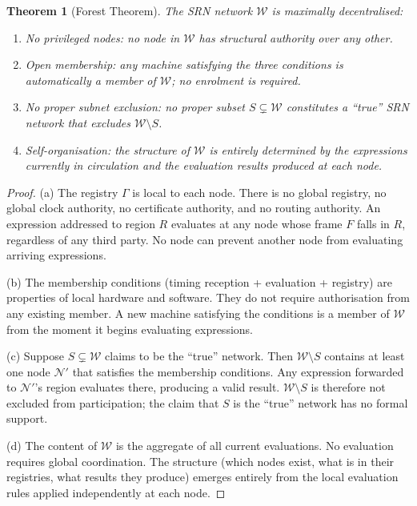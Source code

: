 \documentclass[twocolumn,11pt,a4paper]{article}
\newtheorem{theorem}{Theorem}[section]
\theoremstyle{definition}
\theoremstyle{remark}
\newcommand{\Node}{\mathcal{N}}
\newcommand{\Reg}{\Gamma}
\begin{document}
\begin{theorem}[Forest Theorem]
\label{thm:forest}
The SRN network $\mathcal{W}$ is maximally decentralised:
\begin{enumerate}[label=(\alph*)]
\item \emph{No privileged nodes}: no node in $\mathcal{W}$ has
  structural authority over any other.
\item \emph{Open membership}: any machine satisfying the three conditions
  is automatically a member of $\mathcal{W}$; no enrolment is required.
\item \emph{No proper subnet exclusion}: no proper subset $S \subsetneq
  \mathcal{W}$ constitutes a ``true'' SRN network that excludes
  $\mathcal{W} \setminus S$.
\item \emph{Self-organisation}: the structure of $\mathcal{W}$ is
  entirely determined by the expressions currently in circulation and
  the evaluation results produced at each node.
\end{enumerate}
\end{theorem}
\begin{proof}
(a) The registry $\Reg$ is local to each node.  There is no global
registry, no global clock authority, no certificate authority, and no
routing authority.  An expression addressed to region $R$ evaluates at
any node whose frame $F$ falls in $R$, regardless of any third party.
No node can prevent another node from evaluating arriving expressions.

(b) The membership conditions (timing reception + evaluation + registry)
are properties of local hardware and software.  They do not require
authorisation from any existing member.  A new machine satisfying the
conditions is a member of $\mathcal{W}$ from the moment it begins
evaluating expressions.

(c) Suppose $S \subsetneq \mathcal{W}$ claims to be the ``true'' network.
Then $\mathcal{W} \setminus S$ contains at least one node $\Node'$ that
satisfies the membership conditions.  Any expression forwarded to
$\Node'$'s region evaluates there, producing a valid result.
$\mathcal{W} \setminus S$ is therefore not excluded from participation;
the claim that $S$ is the ``true'' network has no formal support.

(d) The content of $\mathcal{W}$ is the aggregate of all current
evaluations.  No evaluation requires global coordination.  The
structure (which nodes exist, what is in their registries, what
results they produce) emerges entirely from the local evaluation rules
applied independently at each node.
\end{proof}
\end{document}
